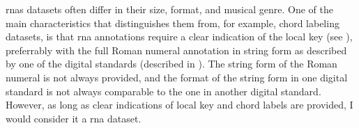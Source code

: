 
\glspl{rna} datasets often  differ in their size, format,
and musical genre. One of the main characteristics that
distinguishes them from, for example, chord labeling
datasets, is that \gls{rna} annotations require a clear
indication of the local key (see ),
preferrably with the full Roman numeral annotation in string
form as described by one of the digital standards (described
in ). The string form of the
Roman numeral is not always provided, and the format of the
string form in one digital standard is not always comparable
to the one in another digital standard. However, as long as
clear indications of local key and chord labels are
provided, I would consider it a \gls{rna} dataset.
